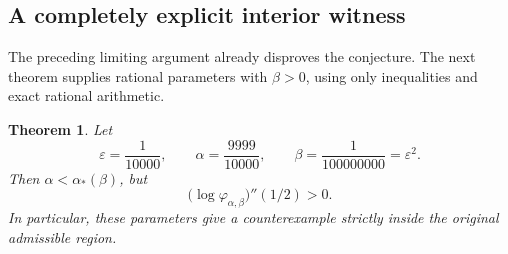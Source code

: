 \documentclass[11pt,a4paper]{article}
\newtheorem{theorem}{Theorem}[section]
\theoremstyle{definition}
\theoremstyle{remark}
\numberwithin{equation}{section}
\begin{document}
\subsection{A completely explicit interior witness}

The preceding limiting argument already disproves the conjecture.
The next theorem supplies rational parameters with $\beta>0$, using
only inequalities and exact rational arithmetic.

\begin{theorem}
\label{thm:wright-interior}
Let
\[
 \varepsilon=\frac1{10000},\qquad
 \alpha=\frac{9999}{10000},\qquad
 \beta=\frac1{100000000}=\varepsilon^2.
\]
Then $\alpha<\alpha_*(\beta)$, but
\[
 \bigl(\log\varphi_{\alpha,\beta}\bigr)''(1/2)>0.
\]
In particular, these parameters give a counterexample strictly inside
the original admissible region.
\end{theorem}
\end{document}
